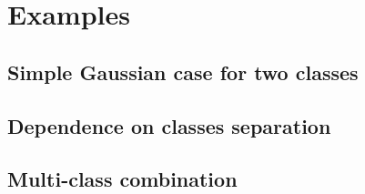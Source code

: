 \section{Examples}
\subsection{Simple Gaussian case for two classes}

\subsection{Dependence on classes separation}

\subsection{Multi-class combination}

